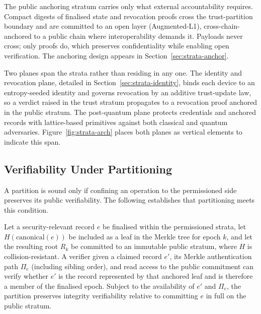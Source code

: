 The public anchoring stratum carries only what external accountability requires. Compact digests of finalised state and revocation proofs cross the trust-partition boundary and are committed to an open layer (Augmented-L1), cross-chain-anchored to a public chain where interoperability demands it. Payloads never cross; only proofs do, which preserves confidentiality while enabling open verification. The anchoring design appears in Section~\ref{sec:strata-anchor}.

Two planes span the strata rather than residing in any one. The identity and revocation plane, detailed in Section~\ref{sec:strata-identity}, binds each device to an entropy-seeded identity and governs revocation by an additive trust-update law, so a verdict raised in the trust stratum propagates to a revocation proof anchored in the public stratum. The post-quantum plane protects credentials and anchored records with lattice-based primitives against both classical and quantum adversaries. Figure~\ref{fig:strata-arch} places both planes as vertical elements to indicate this span.

\subsection{Verifiability Under Partitioning}
\label{subsec:strata-theorem}

A partition is sound only if confining an operation to the permissioned side preserves its public verifiability. The following establishes that partitioning meets this condition.

\begin{theorem}
\label{thm:verifiability}
Let a security-relevant record $e$ be finalised within the permissioned strata,
let $H(\mathrm{canonical}(e))$ be included as a leaf in the Merkle tree for
epoch $k$, and let the resulting root $R_k$ be committed to an immutable public
stratum, where $H$ is collision-resistant. A verifier given a claimed record
$e'$, its Merkle authentication path $\Pi_e$ (including sibling order), and read
access to the public commitment can verify whether $e'$ is the record represented
by that anchored leaf and is therefore a member of the finalised epoch. Subject
to the availability of $e'$ and $\Pi_e$, the partition preserves integrity
verifiability relative to committing $e$ in full on the public stratum.
\end{theorem}

